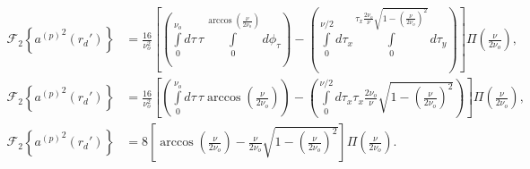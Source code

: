 \documentclass[11pt]{article}
\begin{document}
\begin{align}
  \mathcal{F}_2\left\{{a^{(p)}}^2(r_d')\right\}&= \frac{16}{\nu_o^2}\left[\left(\int\limits_0^{\nu_o} d\tau\, \tau\int\limits_0^{\arccos\left(\frac{\nu}{2\nu_o}\right)}d\phi_{\tau}\right) - \left(\int\limits_0^{\nu/2}d\tau_x \int\limits_0^{\tau_x\frac{2\nu_o}{\nu}\sqrt{1 - \left(\frac{\nu}{2\nu_o}\right)^2}}d\tau_y\right)\right]\Pi\left(\frac{\nu}{2\nu_o}\right),\\
  \mathcal{F}_2\left\{{a^{(p)}}^2(r_d')\right\} &= \frac{16}{\nu_o^2}\left[\left(\int\limits_0^{\nu_o} d\tau\,\tau\arccos\left(\frac{\nu}{2\nu_o}\right)\right) - \left(\int\limits_0^{\nu/2}d\tau_x \tau_x \frac{2\nu_o}{\nu}\sqrt{1 - \left(\frac{\nu}{2\nu_o}\right)^2}\right)\right]\Pi\left(\frac{\nu}{2\nu_o}\right),\\
  \mathcal{F}_2\left\{{a^{(p)}}^2(r_d')\right\} &= 8\left[\arccos\left(\frac{\nu}{2\nu_o}\right) - \frac{\nu}{2\nu_o}\sqrt{1 - \left(\frac{\nu}{2\nu_o}\right)^2}\right]\Pi\left(\frac{\nu}{2\nu_o}\right).
\end{align}
\end{document}
